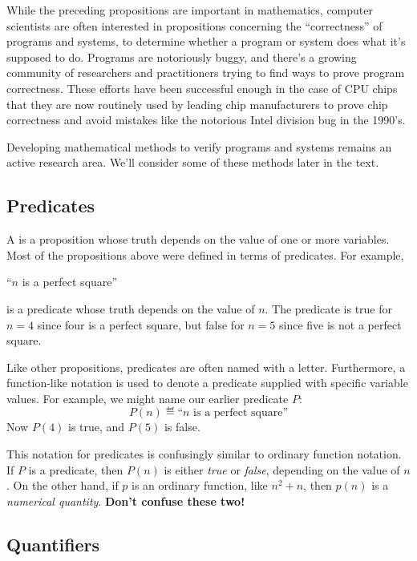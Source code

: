 While the preceding propositions are important in mathematics,
computer scientists are often interested in propositions concerning
the ``correctness'' of programs and systems, to determine whether a
program or system does what it's supposed to do.  Programs are
notoriously buggy, and there's a growing community of researchers and
practitioners trying to find ways to prove program correctness.  These
efforts have been successful enough in the case of CPU chips that they
are now routinely used by leading chip manufacturers to prove chip
correctness and avoid mistakes like the notorious Intel division bug
in the 1990's.

Developing mathematical methods to verify programs and systems remains an
active research area.  We'll consider some of these methods later in the
text.

\subsection{Predicates}
A  is a proposition whose truth depends on the value of
one or more variables.  Most of the propositions above were defined in
terms of predicates.  For example,
%
\begin{center}
``$n$ is a perfect square''
\end{center}
%
is a predicate whose truth depends on the value of $n$.  The predicate is
true for $n = 4$ since four is a perfect square, but false for $n = 5$
since five is not a perfect square.  

Like other propositions, predicates are often named with a letter.
Furthermore, a function-like notation is used to denote a predicate
supplied with specific variable values.  For example, we might name
our earlier predicate $P$:
%
\[
P(n) \eqdef \text{``$n$ is a perfect square''}
\]
%
Now $P(4)$ is true, and $P(5)$ is false.

This notation for predicates is confusingly similar to ordinary function
notation.  If $P$ is a predicate, then $P(n)$ is either \textit{true} or
\textit{false}, depending on the value of $n$.  On the other hand, if $p$
is an ordinary function, like $n^2 + n$, then $p(n)$ is a
\textit{numerical quantity}.  \textbf{Don't confuse these two!}

\newcommand{\solves}{\text{Solves}}
\newcommand{\probs}{\text{Probs}}
\newcommand{\even}{\text{Evens}}
\newcommand{\primes}{\text{Primes}}

\subsection{Quantifiers}

